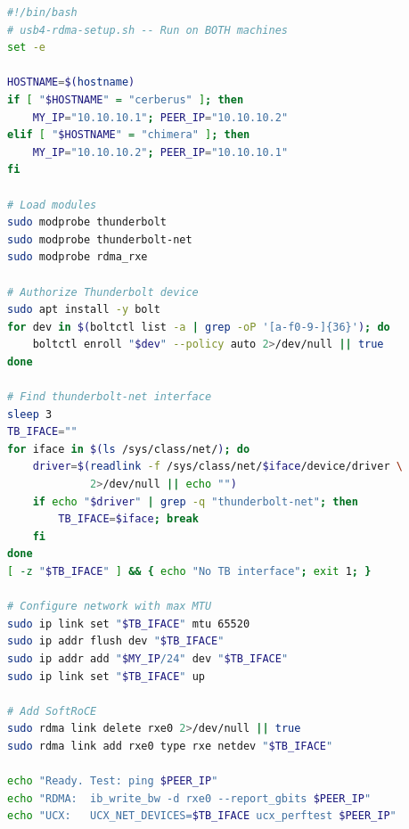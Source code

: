 \documentclass[11pt,letterpaper]{article}
\begin{document}
\begin{lstlisting}[language=bash,caption={USB4 SoftRoCE setup script}]
#!/bin/bash
# usb4-rdma-setup.sh -- Run on BOTH machines
set -e

HOSTNAME=$(hostname)
if [ "$HOSTNAME" = "cerberus" ]; then
    MY_IP="10.10.10.1"; PEER_IP="10.10.10.2"
elif [ "$HOSTNAME" = "chimera" ]; then
    MY_IP="10.10.10.2"; PEER_IP="10.10.10.1"
fi

# Load modules
sudo modprobe thunderbolt
sudo modprobe thunderbolt-net
sudo modprobe rdma_rxe

# Authorize Thunderbolt device
sudo apt install -y bolt
for dev in $(boltctl list -a | grep -oP '[a-f0-9-]{36}'); do
    boltctl enroll "$dev" --policy auto 2>/dev/null || true
done

# Find thunderbolt-net interface
sleep 3
TB_IFACE=""
for iface in $(ls /sys/class/net/); do
    driver=$(readlink -f /sys/class/net/$iface/device/driver \
             2>/dev/null || echo "")
    if echo "$driver" | grep -q "thunderbolt-net"; then
        TB_IFACE=$iface; break
    fi
done
[ -z "$TB_IFACE" ] && { echo "No TB interface"; exit 1; }

# Configure network with max MTU
sudo ip link set "$TB_IFACE" mtu 65520
sudo ip addr flush dev "$TB_IFACE"
sudo ip addr add "$MY_IP/24" dev "$TB_IFACE"
sudo ip link set "$TB_IFACE" up

# Add SoftRoCE
sudo rdma link delete rxe0 2>/dev/null || true
sudo rdma link add rxe0 type rxe netdev "$TB_IFACE"

echo "Ready. Test: ping $PEER_IP"
echo "RDMA:  ib_write_bw -d rxe0 --report_gbits $PEER_IP"
echo "UCX:   UCX_NET_DEVICES=$TB_IFACE ucx_perftest $PEER_IP"
\end{lstlisting}



\end{document}
